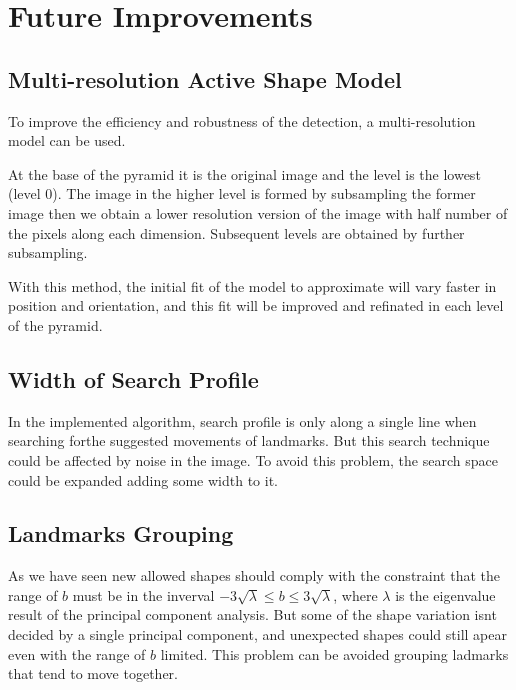 \section{Future Improvements}

\subsection{Multi-resolution Active Shape Model}
To improve the efficiency and robustness of the detection, a
multi-resolution model can be used.

At the base of the pyramid it is the original image and
the level is the lowest (level 0). The image in the higher
level is formed by subsampling the former image then we obtain
a lower resolution version of the image with half number of
the pixels along each dimension. Subsequent levels are
obtained by further subsampling.

With this method, the initial fit of the model to approximate
will vary faster in position and orientation, and this fit will be
improved and refinated in each level of the pyramid.

\subsection{Width of Search Profile}
In the implemented algorithm, search profile is only
along a single line when searching forthe suggested
movements of landmarks. But this search technique could
be affected by noise in the image. To avoid this problem,
the search space could be expanded adding some width to it. 

\subsection{Landmarks Grouping}
As we have seen new allowed shapes should comply with
the constraint that the range of $b$ must be in the inverval
$-3\sqrt\lambda \leq b \leq 3\sqrt\lambda$, where $\lambda$ is the
eigenvalue result of the principal component analysis. But some of
the shape variation isnt decided by a single principal component, and
unexpected shapes could still apear even with the range of $b$ limited.
This problem can be avoided grouping ladmarks that tend to move together.